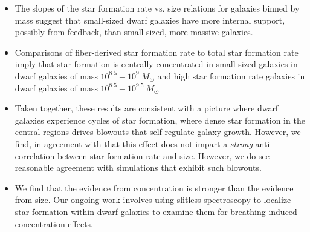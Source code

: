 \documentclass[iop]{emulateapj}
\begin{document}
\begin{itemize}
\item The slopes of the star formation rate vs. size relations for galaxies binned by mass suggest that small-sized dwarf galaxies have more internal support, possibly from feedback, than small-sized, more massive galaxies.

\item Comparisons of fiber-derived star formation rate to total star formation rate imply that star formation is centrally concentrated in small-sized galaxies in dwarf galaxies of mass $10^{8.5}-10^{9} \  M_{\odot}$ and high star formation rate galaxies in dwarf galaxies of mass $10^{8.5}-10^{9.5} \  M_{\odot}$

\item Taken together, these results are consistent with a picture where dwarf galaxies experience cycles of star formation, where dense star formation in the central regions drives blowouts that self-regulate galaxy growth. However, we find, in agreement with \citet{Patel18} that this effect does not impart a \textit{strong} anti-correlation between star formation rate and size. However, we do see reasonable agreement with simulations that exhibit such blowouts.

\item We find that the evidence from concentration is stronger than the evidence from size. Our ongoing work involves using slitless spectroscopy to localize star formation within dwarf galaxies to examine them for breathing-induced concentration effects.

\end{itemize}






\end{document}

